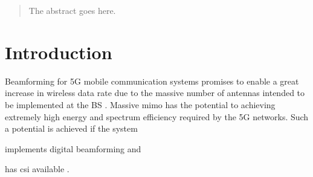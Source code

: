 \documentclass[conference]{IEEEtran}
\begin{document}




\maketitle


\begin{abstract}
The abstract goes here.
\end{abstract}





%
\IEEEpeerreviewmaketitle



\section{Introduction}

Beamforming for 5G mobile communication systems promises to enable a great
increase in wireless data rate due to the massive number of antennas intended to
be implemented at the \gls{BS} . Massive \gls{mimo} has the potential to achieving
extremely high energy and spectrum efficiency required by the 5G
networks\cite{Larsson:2014}.
Such a potential is achieved if the system
\begin{inparaenum}[(i)]
\item implements digital beamforming and
\item has \gls{csi} available \cite{Gao:2016a}.
\end{inparaenum}
\end{document}
